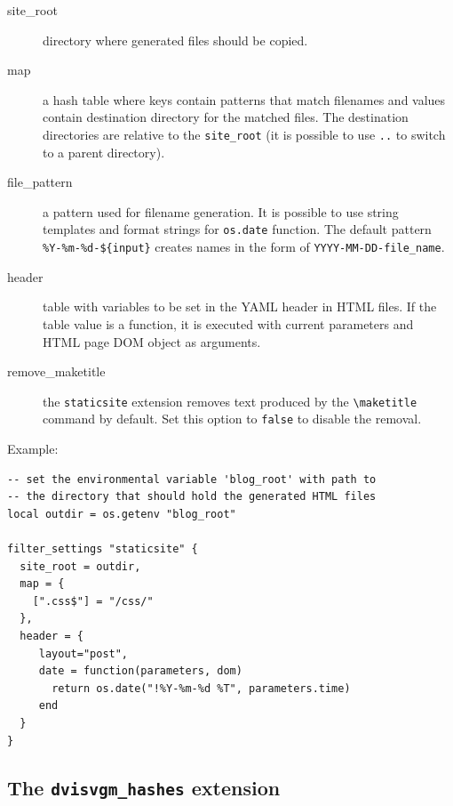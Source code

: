 \begin{description}
\item[site\_root]
directory where generated files should be copied.
\item[map]
a hash table where keys contain patterns that match filenames and values
contain destination directory for the matched files. The destination
directories are relative to the \texttt{site\_root} (it is possible to
use \texttt{..} to switch to a parent directory).
\item[file\_pattern]
a pattern used for filename generation. It is possible to use string
templates and format strings for \texttt{os.date} function. The default
pattern \texttt{\%Y-\%m-\%d-\$\{input\}} creates names in the form of
\texttt{YYYY-MM-DD-file\_name}.
\item[header]
table with variables to be set in the YAML header in HTML files. If the
table value is a function, it is executed with current parameters and
HTML page DOM object as arguments.
\item[remove\_maketitle]
the \texttt{staticsite} extension removes text produced by the
\texttt{\textbackslash{}maketitle} command by default. Set this option
to \texttt{false} to disable the removal.
\end{description}

Example:

\begin{verbatim}
-- set the environmental variable 'blog_root' with path to 
-- the directory that should hold the generated HTML files
local outdir = os.getenv "blog_root" 

filter_settings "staticsite" {
  site_root = outdir, 
  map = {
    [".css$"] = "/css/"
  },
  header = {
     layout="post",
     date = function(parameters, dom)
       return os.date("!%Y-%m-%d %T", parameters.time)
     end
  }
}
\end{verbatim}

\subsection{\texorpdfstring{The \texttt{dvisvgm\_hashes}
extension}{The dvisvgm\_hashes extension}}\label{the-dvisvgm_hashes-extension}

